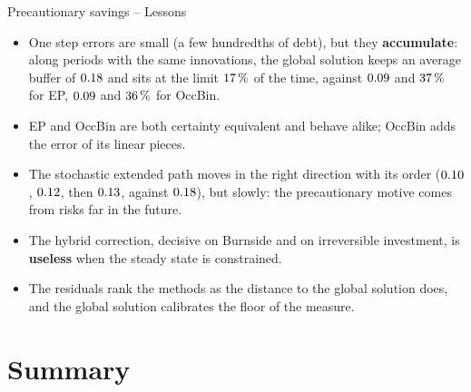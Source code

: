 \documentclass[11pt,aspectratio=169]{beamer}
\begin{document}
\begin{frame}{Precautionary savings -- Lessons}

\begin{itemize}

\item One step errors are small (a few hundredths of debt), but they \textbf{accumulate}: along \bsTsim{} periods with the same innovations, the global solution keeps an average buffer of $0.18$ and sits at the limit $17\,\%$ of the time, against $0.09$ and $37\,\%$ for EP, $0.09$ and $36\,\%$ for OccBin.

\item EP and OccBin are both certainty equivalent and behave alike; OccBin adds the error of its linear pieces.

\item The stochastic extended path moves in the right direction with its order ($0.10$, $0.12$, then $0.13$, against $0.18$), but slowly: the precautionary motive comes from risks far in the future.

\item The hybrid correction, decisive on Burnside and on irreversible investment, is \textbf{useless} when the steady state is constrained.

\item The residuals rank the methods as the distance to the global solution does, and the global solution calibrates the floor of the measure.

\end{itemize}

\end{frame}

\section{Summary}
\end{document}
